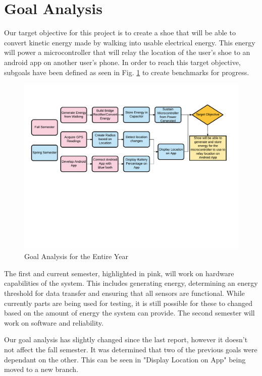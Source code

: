 \documentclass[letterpaper, 12 pt, onecolumn, hidelinks]{ieeetran}
\begin{document}
\section{Goal Analysis}\label{sec:Goal}
Our target objective for this project is to create a shoe that will be able to convert kinetic energy made by walking into usable electrical energy. This energy will power a microcontroller that will relay the location of the user's shoe to an android app on another user's phone. In order to reach this target objective, subgoals have been defined as seen in Fig. \ref{fig:Flowchart} to create benchmarks for progress.

\begin{figure}[h]
	\begin{center}
		\includegraphics[trim=25 275 10 75, clip, width=\columnwidth]{ProjectStrideGoalAnaylsis.pdf}
	\end{center}
	\vspace{-1em}
	\caption{\label{fig:Flowchart}Goal Analysis for the Entire Year}
\end{figure}

The first and current semester, highlighted in pink, will work on hardware capabilities of the system. This includes generating energy, determining an energy threshold for data transfer and ensuring that all sensors are functional. While currently parts are being used for testing, it is still possible for these to changed based on the amount of energy the system can provide. The second semester will work on software and reliability.

Our goal analysis has slightly changed since the last report, however it doesn't not affect the fall semester. It was determined that two of the previous goals were dependant on the other. This can be seen in "Display Location on App" being moved to a new branch.
\end{document}

